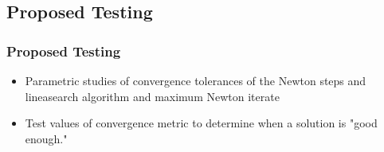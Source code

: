 \documentclass[compress,xcolor=table]{beamer}
\begin{document}
\subsection[Testing]{Proposed Testing}
\begin{frame}
\frametitle{Proposed Testing}

\begin{itemize}
\item{Parametric studies of convergence tolerances of the Newton steps and lineasearch algorithm and maximum Newton iterate}
\item{Test values of convergence metric to determine when a solution is "good enough."}
\end{itemize}

\end{frame}
\end{document}
